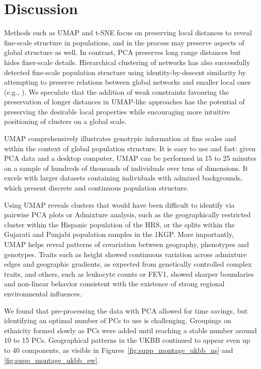 \section{Discussion}
Methods such as UMAP and t-SNE focus on preserving local distances to reveal fine-scale structure in populations, and in the process may preserve aspects of global structure as well. In contrast, PCA preserves long range distances but hides finer-scale details. Hierarchical clustering of networks has also successfully detected fine-scale population structure using identity-by-descent similarity by attempting to preserve relations between global networks and smaller local ones (e.g., \citep{han2017clustering}). We speculate that the addition of weak constraints favouring the preservation of longer distances in UMAP-like approaches has the potential of preserving the desirable local properties while encouraging more intuitive positioning of clusters on a global scale.

UMAP comprehensively illustrates genotypic information at fine scales and within the context of global population structure. It is easy to use and fast: given PCA data and a desktop computer, UMAP can be performed in 15 to 25 minutes on a sample of hundreds of thousands of individuals over tens of dimensions. It excels with larger datasets containing individuals with admixed backgrounds, which present discrete and continuous population structure.

Using UMAP reveals clusters that would have been difficult to identify via pairwise PCA plots or Admixture analysis, such as the geographically restricted cluster within the Hispanic population of the HRS, or the splits within the Gujarati and Punjabi population samples in the 1KGP. More importantly, UMAP helps reveal patterns of covariation between geography, phenotypes and genotypes. Traits such as height showed continuous variation across admixture edges and geographic gradients, as expected from genetically controlled complex traits, and others, such as leukocyte counts or FEV1, showed sharper boundaries and non-linear behavior consistent with the existence of strong regional environmental influences. 

We found that pre-processing the data with PCA allowed for time savings, but identifying an optimal number of PCs to use is challenging. Groupings on ethnicity formed slowly as PCs were added until reaching a stable number around 10 to 15 PCs. Geographical patterns in the UKBB continued to appear even up to 40 components, as visible in Figures~\ref{fig:supp_montage_ukbb_ns} and \ref{fig:supp_montage_ukbb_ew}. 

